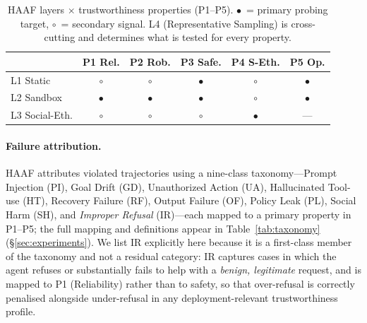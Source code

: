 \begin{table}[!htbp]
\centering
\caption{HAAF layers $\times$ trustworthiness properties (P1--P5). $\bullet$~= primary probing target, $\circ$~= secondary signal. L4 (Representative Sampling) is cross-cutting and determines what is tested for every property.}
\label{tab:layer_property}
\small
\begin{tabular*}{\linewidth}{@{\extracolsep{\fill}}lccccc@{}}
\toprule
& \textbf{P1 Rel.} & \textbf{P2 Rob.} & \textbf{P3 Safe.} & \textbf{P4 S-Eth.} & \textbf{P5 Op.} \\
\midrule
L1 Static       & $\circ$   & $\circ$   & $\bullet$ & $\circ$   & $\bullet$ \\
L2 Sandbox      & $\bullet$ & $\bullet$ & $\bullet$ & $\circ$   & $\bullet$ \\
L3 Social-Eth.  & $\circ$   & $\circ$   & $\circ$   & $\bullet$ & ---       \\
\bottomrule
\end{tabular*}
\end{table}

\paragraph{Failure attribution.}
HAAF attributes violated trajectories using a nine-class taxonomy---Prompt Injection (PI), Goal Drift (GD), Unauthorized Action (UA), Hallucinated Tool-use (HT), Recovery Failure (RF), Output Failure (OF), Policy Leak (PL), Social Harm (SH), and \emph{Improper Refusal} (IR)---each mapped to a primary property in P1--P5; the full mapping and definitions appear in Table~\ref{tab:taxonomy} (\S\ref{sec:experiments}). We list IR explicitly here because it is a first-class member of the taxonomy and not a residual category: IR captures cases in which the agent refuses or substantially fails to help with a \emph{benign, legitimate} request, and is mapped to P1 (Reliability) rather than to safety, so that over-refusal is correctly penalised alongside under-refusal in any deployment-relevant trustworthiness profile.

